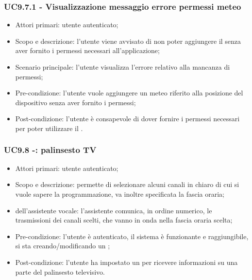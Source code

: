 \subsubsection{UC9.7.1 - Visualizzazione messaggio errore permessi meteo}
\begin{itemize}
	\item  Attori primari: utente autenticato;
	\item  Scopo e descrizione: l'utente viene avvisato di non poter aggiungere il  senza aver fornito i permessi necessari all'applicazione;
	\item  Scenario principale: l'utente visualizza l'errore relativo alla mancanza di permessi;
	\item  Pre-condizione: l'utente vuole aggiungere un  meteo riferito alla posizione del dispositivo  senza aver fornito i permessi;
	\item  Post-condizione: l'utente è consapevole di dover fornire i permessi necessari per poter utilizzare il .
\end{itemize}
\subsubsection{UC9.8 -: palinsesto TV}
\begin{itemize}
	\item  Attori primari: utente autenticato;
	\item  Scopo e descrizione: permette di selezionare alcuni canali in chiaro di cui si vuole sapere la programmazione, va inoltre specificata la fascia oraria;
	\item  {} dell'assistente vocale: l'assistente comunica, in ordine numerico, le trasmissioni dei canali scelti, che vanno in onda nella fascia oraria scelta;
	\item  Pre-condizione: l'utente è autenticato, il sistema è funzionante e raggiungibile, si sta creando/modificando un ;
	\item  Post-condizione: l'utente ha impostato un  per ricevere informazioni su una parte del palinsesto televisivo.
\end{itemize}
